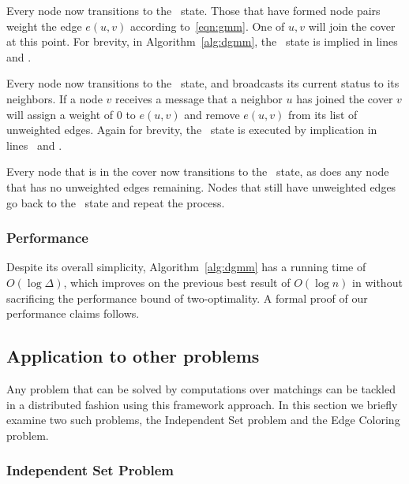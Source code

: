 \documentclass[conference, 10pt, letter]{IEEEtran}
\begin{document}
Every node now transitions to the \cUd\ state. Those that have formed node pairs weight the edge $e(u,v)$ according to~\eqref{eqn:gmm}. One of $u,v$ will join the cover at this point. For brevity, in Algorithm~\ref{alg:dgmm}, the \cUd\ state is implied in lines~ and .

Every node now transitions to the \cEd\ state, and broadcasts its current status to its neighbors. If a node $v$ receives a message that a neighbor $u$ has joined the cover $v$ will assign a weight of 0 to $e(u,v)$ and remove $e(u,v)$ from its list of unweighted edges. Again for brevity, the \cEd\ state is executed by implication in lines~ and .

Every node that is in the cover now transitions to the \cDd\ state, as does any node that has no unweighted edges remaining. Nodes that still have unweighted edges go back to the \cCd\ state and repeat the process. 



\subsubsection{Performance}

\label{ssb:algorithms-dgmm-performance}

Despite its overall simplicity, Algorithm~\ref{alg:dgmm} has a running time of $O(\log \Delta)$, which improves on the previous best result of $O(\log n)$ in \cite{1582746} without sacrificing the performance bound of two-optimality. A formal proof of our performance claims follows.



\subsection{Application to other problems}
\label{sub:algorithms-other}
Any problem that can be solved by computations over matchings can be tackled in a distributed fashion using this framework approach. In this section we briefly examine two such problems, the Independent Set problem and the Edge Coloring problem.

\subsubsection{Independent Set Problem}
\label{ssb:algorithms-other-is}
\end{document}
